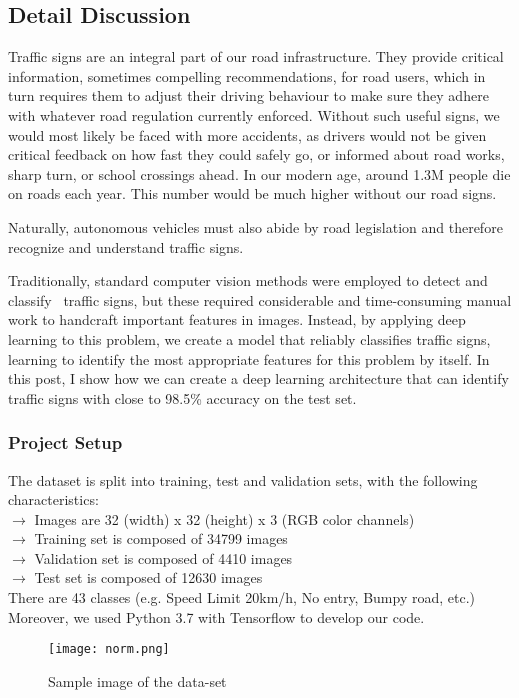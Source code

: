 \subsection{Detail Discussion}

Traffic signs are an integral part of our road infrastructure. They provide critical information, sometimes compelling recommendations, for road users, which in turn requires them to adjust their driving behaviour to make sure they adhere with whatever road regulation currently enforced. Without such useful signs, we would most likely be faced with more accidents, as drivers would not be given critical feedback on how fast they could safely go, or informed about road works, sharp turn, or school crossings ahead. In our modern age, around 1.3M people die on roads each year. This number would be much higher without our road signs. 

Naturally, autonomous vehicles must also abide by road legislation and therefore recognize and understand traffic signs.

Traditionally, standard computer vision methods were employed to detect and classify~\cite{649946} traffic signs, but these required considerable and time-consuming manual work to handcraft important features in images. Instead, by applying deep learning to this problem, we create a model that reliably classifies traffic signs, learning to identify the most appropriate features for this problem by itself. In this post, I show how we can create a deep learning architecture that can identify traffic signs with close to 98.5\% accuracy on the test set.

\subsubsection{Project Setup}
The dataset is split into training, test and validation sets, with the following characteristics:\\
$\to$ Images are 32 (width) x 32 (height) x 3 (RGB color channels)\\
$\to$ Training set is composed of 34799 images\\
$\to$ Validation set is composed of 4410 images\\
$\to$ Test set is composed of 12630 images\\
There are 43 classes (e.g. Speed Limit 20km/h, No entry, Bumpy road, etc.)\\
Moreover, we used Python 3.7 with Tensorflow to develop our code.
\begin{figure}[H]
	\centering
	\texttt{[image: norm.png]}
	\caption{Sample image of the data-set}
\end{figure}

